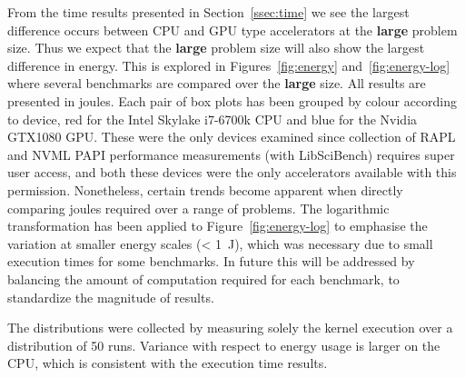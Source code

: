 \documentclass[../document.tex]{subfiles}
\begin{document}

From the time results presented in Section~\ref{ssec:time} we see the largest difference occurs between CPU and GPU type accelerators at the {\bf large} problem size.
Thus we expect that the {\bf large} problem size will also show the largest difference in energy.
This is explored in Figures~\ref{fig:energy} and~\ref{fig:energy-log} where several benchmarks are compared over the {\bf large} size.
All results are presented in joules.
Each pair of box plots has been grouped by colour according to device, red for the Intel Skylake i7-6700k CPU and blue for the Nvidia GTX1080 GPU.
These were the only devices examined since collection of RAPL and NVML PAPI performance measurements (with LibSciBench) requires super user access, and both these devices were the only accelerators available with this permission.
Nonetheless, certain trends become apparent when directly comparing joules required over a range of problems.
The logarithmic transformation has been applied to Figure~\ref{fig:energy-log} to emphasise the variation at smaller energy scales (< \SI{1}{\joule}), which was necessary due to small execution times for some benchmarks.
In future this will be addressed by balancing the amount of computation required for each benchmark, to standardize the magnitude of results.

The distributions were collected by measuring solely the kernel execution over a distribution of 50 runs.
Variance with respect to energy usage is larger on the CPU, which is consistent with the execution time results.
\end{document}
